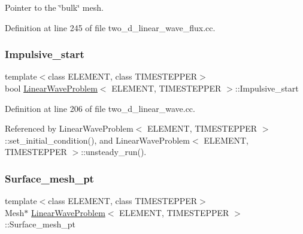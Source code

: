 Pointer to the \char`\"{}bulk\char`\"{} mesh. 



Definition at line 245 of file two\+\_\+d\+\_\+linear\+\_\+wave\+\_\+flux.\+cc.

\mbox{\label{classLinearWaveProblem_a296c67402f065a1a3776064492003670}} 
\subsubsection{\texorpdfstring{Impulsive\+\_\+start}{Impulsive\_start}}
{\footnotesize\ttfamily template$<$class E\+L\+E\+M\+E\+NT, class T\+I\+M\+E\+S\+T\+E\+P\+P\+ER$>$ \\
bool \hyperlink{classLinearWaveProblem}{Linear\+Wave\+Problem}$<$ E\+L\+E\+M\+E\+NT, T\+I\+M\+E\+S\+T\+E\+P\+P\+ER $>$\+::Impulsive\+\_\+start\hspace{0.3cm}{\ttfamily [private]}}



Definition at line 206 of file two\+\_\+d\+\_\+linear\+\_\+wave.\+cc.



Referenced by Linear\+Wave\+Problem$<$ E\+L\+E\+M\+E\+N\+T, T\+I\+M\+E\+S\+T\+E\+P\+P\+E\+R $>$\+::set\+\_\+initial\+\_\+condition(), and Linear\+Wave\+Problem$<$ E\+L\+E\+M\+E\+N\+T, T\+I\+M\+E\+S\+T\+E\+P\+P\+E\+R $>$\+::unsteady\+\_\+run().

\mbox{\label{classLinearWaveProblem_a286d4ca798729d03303b072bb704593f}} 
\subsubsection{\texorpdfstring{Surface\+\_\+mesh\+\_\+pt}{Surface\_mesh\_pt}}
{\footnotesize\ttfamily template$<$class E\+L\+E\+M\+E\+NT, class T\+I\+M\+E\+S\+T\+E\+P\+P\+ER$>$ \\
Mesh$\ast$ \hyperlink{classLinearWaveProblem}{Linear\+Wave\+Problem}$<$ E\+L\+E\+M\+E\+NT, T\+I\+M\+E\+S\+T\+E\+P\+P\+ER $>$\+::Surface\+\_\+mesh\+\_\+pt\hspace{0.3cm}{\ttfamily [private]}}



